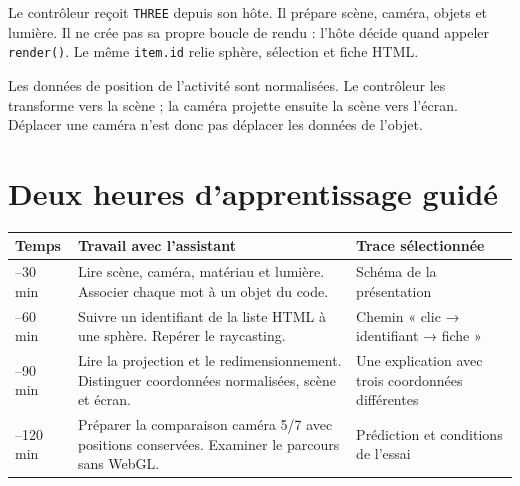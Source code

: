 \documentclass[
  canadien,
  11pt,
  a4paper,
]{report}
\newcounter{none} %
\begin{document}
Le contrôleur reçoit \texttt{THREE} depuis son hôte. Il prépare scène,
caméra, objets et lumière. Il ne crée pas sa propre boucle de rendu :
l'hôte décide quand appeler \texttt{render()}. Le même \texttt{item.id}
relie sphère, sélection et fiche HTML.

Les données de position de l'activité sont normalisées. Le contrôleur
les transforme vers la scène ; la caméra projette ensuite la scène vers
l'écran. Déplacer une caméra n'est donc pas déplacer les données de
l'objet.

\section{Deux heures d'apprentissage
guidé}\label{deux-heures-dapprentissage-guiduxe9-2}

{\def\LTcaptype{none} %
\begin{longtable}[]{@{}
  >{\raggedright\arraybackslash}p{}
  >{\raggedright\arraybackslash}p{}
  >{\raggedright\arraybackslash}p{}@{}}
\toprule\noalign{}
\begin{minipage}[b]{\linewidth}\raggedright
Temps
\end{minipage} & \begin{minipage}[b]{\linewidth}\raggedright
Travail avec l'assistant
\end{minipage} & \begin{minipage}[b]{\linewidth}\raggedright
Trace sélectionnée
\end{minipage} \\
\midrule\noalign{}
\endhead
\bottomrule\noalign{}
\endlastfoot
0--30 min & Lire scène, caméra, matériau et lumière. Associer chaque mot
à un objet du code. & Schéma de la présentation \\
30--60 min & Suivre un identifiant de la liste HTML à une sphère.
Repérer le raycasting. & Chemin « clic → identifiant → fiche » \\
60--90 min & Lire la projection et le redimensionnement. Distinguer
coordonnées normalisées, scène et écran. & Une explication avec trois
coordonnées différentes \\
90--120 min & Préparer la comparaison caméra 5/7 avec positions
conservées. Examiner le parcours sans WebGL. & Prédiction et conditions
de l'essai \\
\end{longtable}
}
\end{document}
